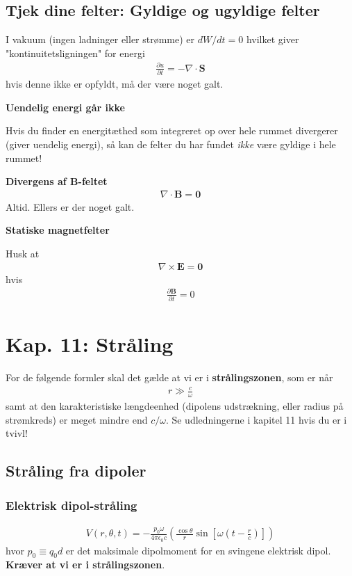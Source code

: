 \documentclass[a4paper]{article}
\begin{document}
    \subsection{Tjek dine felter: Gyldige og ugyldige felter}
    I vakuum (ingen ladninger eller strømme) er \(dW / dt = 0\) hvilket giver "kontinuitetsligningen" for energi \begin{align*}
        \frac{\partial u}{\partial t} = - \nabla \cdot \mathbf{S} \tag{8.12}
    \end{align*} 
    hvis denne ikke er opfyldt, må der være noget galt.

    \textbf{Uendelig energi går ikke}

    Hvis du finder en energitæthed som integreret op over hele rummet divergerer (giver uendelig energi), så kan de felter du har fundet \textit{ikke} være gyldige i hele rummet!
    
    \textbf{Divergens af \(\mathbf{B}\)-feltet }
    \begin{align*}
        \nabla \cdot \mathbf{B} = \mathbf{0}
    \end{align*} 
    Altid. Ellers er der noget galt.

    \textbf{Statiske magnetfelter}
    
    Husk at \begin{align*}
        \nabla \times \mathbf{E} = \mathbf{0}
    \end{align*} 
    hvis \begin{align*}
        \frac{\partial \mathbf{B}}{\partial t} = 0
    \end{align*}

    \newpage
    \section{Kap. 11: Stråling}
    For de følgende formler skal det gælde at vi er i \textbf{strålingszonen}, som er når
    \begin{align*}
    r \gg \frac{c}{\omega} \tag{11.13}
    \end{align*}
    samt at den karakteristiske længdeenhed (dipolens udstrækning, eller radius på strømkreds) er meget mindre end \(c / \omega \). Se udledningerne i kapitel 11 hvis du er i tvivl! 
    \subsection{Stråling fra dipoler}
    \subsubsection{Elektrisk dipol-stråling}
    \begin{align*}
        \boxed{V(r, \theta , t) = - \frac{p_0 \omega }{4 \pi  \epsilon _0 c} \left( \frac{\cos \theta }{r} \sin \left[ \omega (t - \frac{r}{c}) \right]  \right) } \tag{11.14}
    \end{align*}
    hvor \(p_0 \equiv q_0 d\) er det maksimale dipolmoment for en svingene elektrisk dipol. \textbf{Kræver at vi er i strålingszonen}.
    
\end{document}
